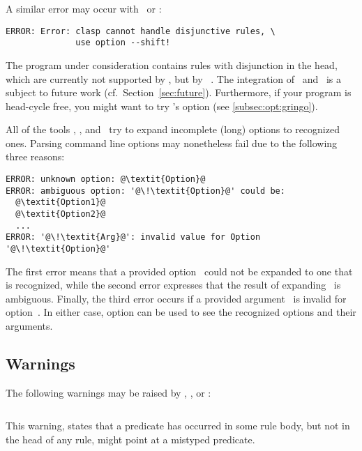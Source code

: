A similar error may occur with \clingo\ or \iclingo:
%
\begin{lstlisting}[numbers=none,escapechar=@]
ERROR: Error: clasp cannot handle disjunctive rules, \
              use option --shift!
\end{lstlisting}
%
The program under consideration contains rules with disjunction in the head,
which are currently not supported by \clasp,
but by \claspD~\cite{drgegrkakoossc08a}.
The integration of \clasp\ and \claspD\ is a subject to future work
(cf.\ Section~\ref{sec:future}).
Furthermore, if your program is head-cycle free, 
you might want to try \gringo's  option (see \ref{subsec:opt:gringo}).

All of the tools \gringo, \clasp, and \clingo\
try to expand incomplete (long) options to recognized ones.
Parsing command line options may nonetheless fail due to the following three reasons:
%
\begin{lstlisting}[numbers=none,escapechar=@]
ERROR: unknown option: @\textit{Option}@
ERROR: ambiguous option: '@\!\textit{Option}@' could be:
  @\textit{Option1}@
  @\textit{Option2}@
  ...
ERROR: '@\!\textit{Arg}@': invalid value for Option '@\!\textit{Option}@'
\end{lstlisting}
%
The first error means that a provided option~
could not be expanded to one that is recognized,
while the second error expresses that the result of expanding~
is ambiguous.
Finally, the third error occurs if a provided argument~\code{\textit{Arg}}
is invalid for option~.
In either case, option \code{--help} can be used to see 
the recognized options and their arguments.


\subsection{Warnings}\label{subsec:warn}

The following warnings may be raised by \gringo, \clingo, or \iclingo:
%
\begin{lstlisting}[numbers=none,escapechar=@]
% warning: @\textit{p}@/@\!\textit{i}@ is never defined
\end{lstlisting}
%
This warning, states that a predicate 
has occurred in some rule body, but not in the head of any rule,
might point at a mistyped predicate.

